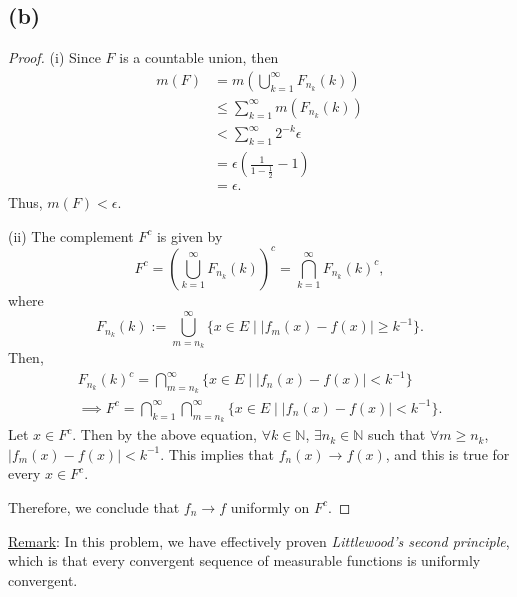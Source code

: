 \documentclass{article}
\newcommand{\N}{\mathbb{N}} %
\begin{document}
\subsection*{(b)}
\begin{proof}
	(i) Since $F$ is a countable union, then
	\begin{align}
		m(F) &= m\left(\bigcup_{k=1}^{\infty} F_{n_k}(k)\right) \\
		& \leq \sum_{k=1}^{\infty} m\left(F_{n_k}(k)\right) \\
		&< \sum_{k=1}^{\infty}2^{-k}\epsilon \\
		&= \epsilon\left(\frac{1}{1-\frac{1}{2}} - 1\right) \\
		&= \epsilon.
	\end{align}
	Thus, $m(F) < \epsilon$.
	
	(ii) The complement $F^c$ is given by
	\begin{equation}
		F^c = \left(\bigcup_{k=1}^{\infty} F_{n_k}(k)\right)^c = \bigcap_{k=1}^{\infty} F_{n_k}(k)^c,
	\end{equation}
	where
	\begin{equation}
		F_{n_k}(k) := \bigcup_{m=n_k}^{\infty} \{x \in E \;|\; |f_m(x) - f(x)|\geq k^{-1}\}.
	\end{equation}
	Then,
	\begin{align}
		F_{n_k}(k)^c = \bigcap_{m=n_k}^{\infty}\{x \in E \;|\; |f_n(x) - f(x)| < k^{-1}\} \\
		\implies F^c = \bigcap_{k=1}^{\infty}\bigcap_{m=n_k}^{\infty}\{x \in E \;|\; |f_n(x) - f(x)| < k^{-1}\}.
	\end{align}
	Let $x \in F^c$. Then by the above equation, $\forall k \in \N$, $\exists n_k \in \N$ such that $\forall m \geq n_k$, $|f_m(x) - f(x)| < k^{-1}$. This implies that $f_n(x) \rightarrow f(x)$, and this is true for every $x \in F^c$.
	
	Therefore, we conclude that $f_n \rightarrow f$ uniformly on $F^c$.
\end{proof}
\underline{Remark}: In this problem, we have effectively proven \textit{Littlewood's second principle}, which is that every convergent sequence of measurable functions is uniformly convergent.
\end{document}
